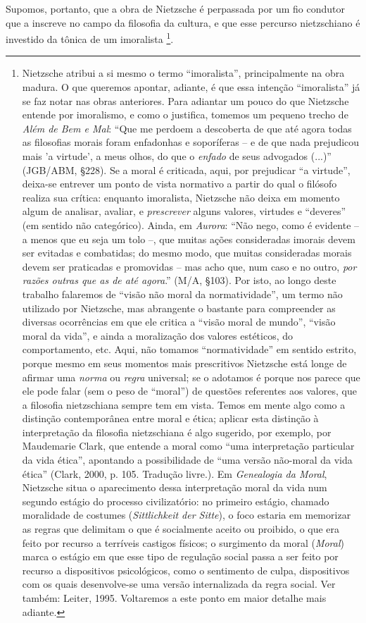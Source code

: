 \documentclass[
	12pt,				%
	openright,			%
	oneside,			%
	a4paper,			%
	english,			%
	french,				%
	spanish,			%
	brazil				%
	]{abntex2}
\begin{document}
	Supomos, portanto, que a obra de Nietzsche é perpassada por um fio condutor que a inscreve no campo da filosofia da cultura, e que esse percurso nietzschiano é investido da tônica de um imoralista
\footnote{Nietzsche atribui a si mesmo o termo “imoralista”, principalmente na obra madura. O que queremos apontar, adiante, é que essa intenção “imoralista” já se faz notar nas obras anteriores. Para adiantar um pouco do que Nietzsche entende por imoralismo, e como o justifica, tomemos um pequeno trecho de \textit{Além de Bem e Mal}: “Que me perdoem a descoberta de que até agora todas as filosofias morais foram enfadonhas e soporíferas – e de que nada prejudicou mais 'a virtude', a meus olhos, do que o \textit{enfado} de seus advogados (...)” (JGB/ABM, §228). Se a moral é criticada, aqui, por prejudicar “a virtude”, deixa-se entrever um ponto de vista normativo a partir do qual o filósofo realiza sua crítica: enquanto imoralista, Nietzsche não deixa em momento algum de analisar, avaliar, e \textit{prescrever} alguns valores, virtudes e “deveres” (em sentido não categórico). Ainda, em \textit{Aurora}: “Não nego, como é evidente – a menos que eu seja um tolo –, que muitas ações consideradas imorais devem ser evitadas e combatidas; do mesmo modo, que muitas consideradas morais devem ser praticadas e promovidas – mas acho que, num caso e no outro, \textit{por razões outras que as de até agora}.” (M/A, §103). Por isto, ao longo deste trabalho falaremos de “visão não moral da normatividade”, um termo não utilizado por Nietzsche, mas abrangente o bastante para compreender as diversas ocorrências em que ele critica a “visão moral de mundo”, “visão moral da vida”, e ainda a moralização dos valores estéticos, do comportamento, etc. Aqui, não tomamos “normatividade” em sentido estrito, porque mesmo em seus momentos mais prescritivos Nietzsche está longe de afirmar uma \textit{norma} ou \textit{regra} universal; se o adotamos é porque nos parece que ele pode falar (sem o peso de “moral”) de questões referentes aos valores, que a filosofia nietzschiana sempre tem em vista. Temos em mente algo como a distinção contemporânea entre moral e ética; aplicar esta distinção à interpretação da filosofia nietzschiana é algo sugerido, por exemplo, por Maudemarie Clark, que entende a moral como “uma interpretação particular da vida ética”, apontando a possibilidade de “uma versão não-moral da vida ética” (Clark, 2000, p. 105. Tradução livre.). Em \textit{Genealogia da Moral}, Nietzsche situa o aparecimento dessa interpretação moral da vida num segundo estágio do processo civilizatório: no primeiro estágio, chamado moralidade de costumes (\textit{Sittlichkeit der Sitte}), o foco estaria em memorizar as regras que delimitam o que é socialmente aceito ou proibido, o que era feito por recurso a terríveis castigos físicos; o surgimento da moral (\textit{Moral}) marca o estágio em que esse tipo de regulação social passa a ser feito por recurso a dispositivos psicológicos, como o sentimento de culpa, dispositivos com os quais desenvolve-se uma versão internalizada da regra social. Ver também: Leiter, 1995. Voltaremos a este ponto em maior detalhe mais adiante. }. 
\end{document}
